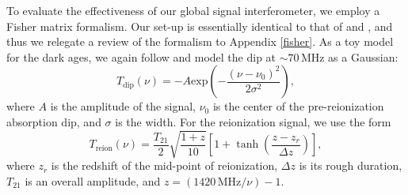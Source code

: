 \documentclass[twocolumn,apj,numberedappendix]{emulateapj}
\newcommand{\mep}[1]{}
\begin{document}
To evaluate the effectiveness of our global signal interferometer, we employ a Fisher matrix formalism. Our set-up is essentially identical to that of \citet{PritchardLoeb2010} and \citet{BernardiLEDA}, \mep{added citation} and thus we relegate a review of the formalism to Appendix \ref{fisher}. As a toy model for the dark ages, we again follow \citet{BernardiLEDA} and model the dip at $\sim 70\,\textrm{MHz}$ as a Gaussian:
\begin{equation}
\label{eq:Dip}
T_\textrm{dip}(\nu) = -A \textrm{exp}\left ( -\frac{(\nu - \nu_0)^2}{2\sigma^2} \right ),
\end{equation}
where $A$ is the amplitude of the signal, $\nu_0$ is the center of the pre-reionization absorption dip, and $\sigma$ is the width. For the reionization signal, we use the form
\begin{equation}
\label{eq:Step}
T_\textrm{reion}(\nu) = \frac{T_{21}}{2} \sqrt{\frac{1+z}{10}}\left[ 1 +  \tanh \left( \frac{z-z_r}{\Delta z} \right)\right],
\end{equation}
where $z_r$ is the redshift of the mid-point of reionization, $\Delta z$ is its rough duration, $T_{21}$ is an overall amplitude, and $z = (1420 \,\textrm{MHz} / \nu) - 1$.
\end{document}
